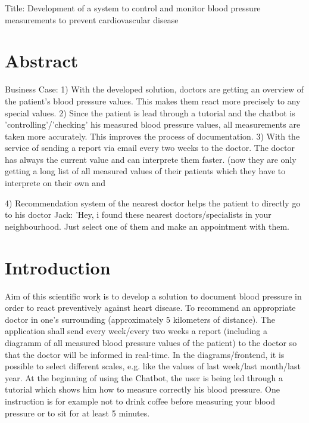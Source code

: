 




Title: Development of a system to control and monitor blood pressure measurements to prevent cardiovascular disease  




\chapter{Abstract}\label{abstract}

Business Case:
1) With the developed solution, doctors are getting an overview of the patient's blood pressure values. This makes them react more precisely to any special values. 
2) Since the patient is lead through a tutorial and the chatbot is 'controlling'/'checking' his measured blood pressure values, all measurements are taken more accurately. This improves the process of documentation.
3) With the service of sending a report via email every two weeks to the doctor. The doctor has always the current value and can interprete them faster. (now they are only getting a long list of all measured values of their patients which they have to interprete on their own and \begin{flushleft}
\end{flushleft}
4) Recommendation system of the nearest doctor helps the patient to directly go to his doctor 
Jack: 'Hey, i found these nearest doctors/specialists in your neighbourhood. Just select one of them and make an appointment with them. 

\chapter{Introduction}\label{introduction}

Aim of this scientific work is to develop a solution to document blood pressure in order to react preventively against heart disease.
To recommend an appropriate doctor in one's surrounding (approximately 5 kilometers of distance).
The application shall send every week/every two weeks a report (including a diagramm of all measured blood pressure values of the patient) to the doctor so that the doctor will be informed in real-time. In the diagrams/frontend, it is possible to select different scales, e.g. like the values of last week/last month/last year. 
At the beginning of using the Chatbot, the user is being led through a tutorial which shows him how to measure correctly his blood pressure. One instruction is for example not to drink coffee before measuring your blood pressure or to sit for at least 5 minutes.

